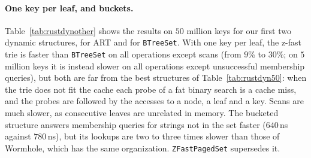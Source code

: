 \documentclass[a4paper]{article}
\newcommand{\?}{\mskip1.5mu}
\begin{document}
\paragraph{One key per leaf, and buckets.} Table~\ref{tab:rustdynother} shows the results on $50$ million keys for our first two dynamic structures, for ART and for \texttt{BTreeSet}. 
With one key per leaf, the z-fast trie is faster than \texttt{BTreeSet} on all operations except scans (from $9$\% to $30$\%; on $5$ million keys 
it is instead slower on all operations except unsuccessful membership queries), but both are far from the best structures of 
Table~\ref{tab:rustdyn50}: when the trie does not fit the cache each probe of a fat binary search is a cache miss, and the probes are followed 
by the accesses to a node, a leaf and a key. Scans are much slower, as consecutive leaves are unrelated in memory. 
The bucketed structure answers membership queries for strings not in the set faster ($640$\,ns against $780$\,ns), but its lookups are 
two to three times slower than those of Wormhole, which has the same organization. \texttt{ZFastPagedSet} supersedes it.
\end{document}
